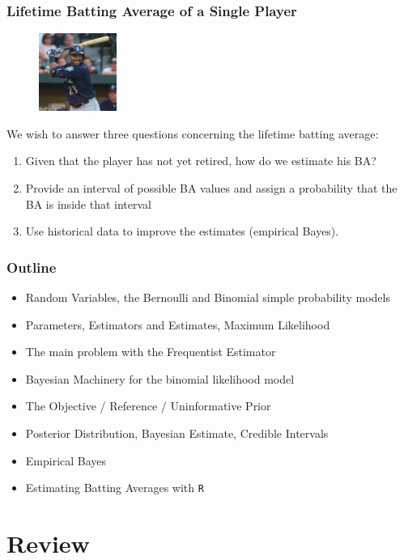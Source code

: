 \documentclass[slides]{beamer} %
\begin{document}
\begin{frame}
	\frametitle{Lifetime Batting Average of a Single Player}

\begin{figure}[htp]
\centering
\includegraphics[width=1.0in]{images/nc.jpeg}
\end{figure}

We wish to answer three questions concerning the lifetime batting average:\pause

\begin{enumerate}
\item Given that the player has not yet retired, how do we estimate his BA? \pause
\item Provide an interval of possible BA values and assign a probability that the BA is inside that interval\pause
\item Use historical data to improve the estimates (empirical Bayes).
\end{enumerate}
\end{frame}

\begin{frame}
	\frametitle{Outline}

\begin{itemize}
\item Random Variables, the Bernoulli and Binomial simple probability models \pause
\item Parameters, Estimators and Estimates, Maximum Likelihood \pause
\item The main problem with the Frequentist Estimator\pause
\item Bayesian Machinery for the binomial likelihood model\pause
\item The Objective / Reference / Uninformative Prior\pause
\item Posterior Distribution, Bayesian Estimate, Credible Intervals \pause
\item Empirical Bayes\pause
\item Estimating Batting Averages with \texttt{R}
\end{itemize}

\end{frame}

\section{Review}
\end{document}
